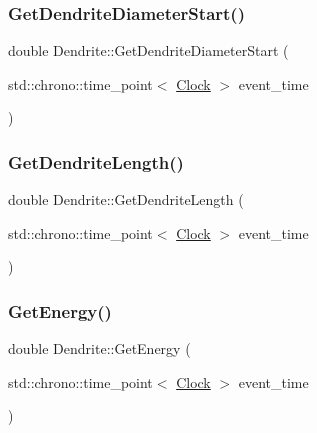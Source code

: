 \mbox{\label{classDendrite_aa103a34ce3d3525b350cb02c0a7855ea}} 
\subsubsection{\texorpdfstring{Get\+Dendrite\+Diameter\+Start()}{GetDendriteDiameterStart()}}
{\footnotesize\ttfamily double Dendrite\+::\+Get\+Dendrite\+Diameter\+Start (\begin{DoxyParamCaption}\item[{std\+::chrono\+::time\+\_\+point$<$ \mbox{\hyperlink{universe_8h_a0ef8d951d1ca5ab3cfaf7ab4c7a6fd80}{Clock}} $>$}]{event\+\_\+time }\end{DoxyParamCaption})\hspace{0.3cm}{\ttfamily [inline]}}

\mbox{\label{classDendrite_a64ebf49c488bb0225e1e5c8a8d9935d9}} 
\subsubsection{\texorpdfstring{Get\+Dendrite\+Length()}{GetDendriteLength()}}
{\footnotesize\ttfamily double Dendrite\+::\+Get\+Dendrite\+Length (\begin{DoxyParamCaption}\item[{std\+::chrono\+::time\+\_\+point$<$ \mbox{\hyperlink{universe_8h_a0ef8d951d1ca5ab3cfaf7ab4c7a6fd80}{Clock}} $>$}]{event\+\_\+time }\end{DoxyParamCaption})\hspace{0.3cm}{\ttfamily [inline]}}

\mbox{\label{classDendrite_a1aa1fd51aab3996cf1a9b0ff6a86647c}} 
\subsubsection{\texorpdfstring{Get\+Energy()}{GetEnergy()}}
{\footnotesize\ttfamily double Dendrite\+::\+Get\+Energy (\begin{DoxyParamCaption}\item[{std\+::chrono\+::time\+\_\+point$<$ \mbox{\hyperlink{universe_8h_a0ef8d951d1ca5ab3cfaf7ab4c7a6fd80}{Clock}} $>$}]{event\+\_\+time }\end{DoxyParamCaption})\hspace{0.3cm}{\ttfamily [inline]}}


